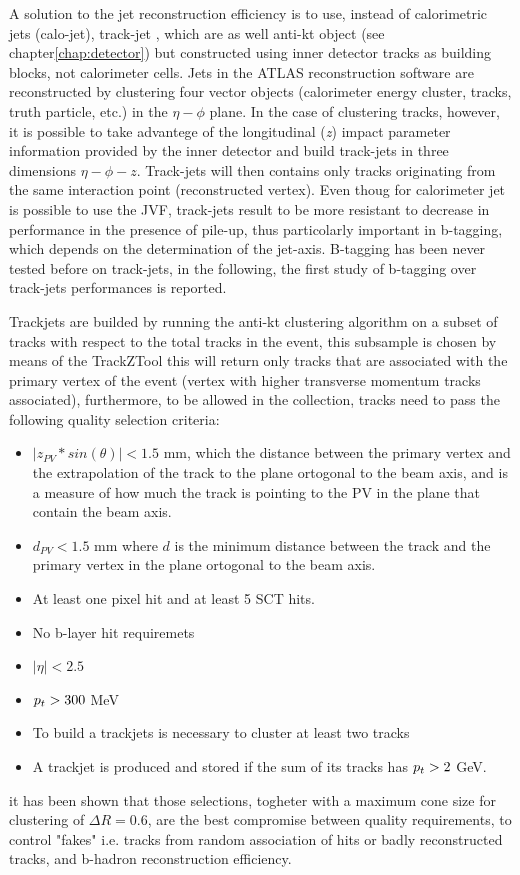 A solution to the jet reconstruction efficiency is to use, instead of calorimetric jets (calo-jet), track-jet , which are as well
anti-kt object (see chapter\ref{chap:detector}) but constructed using inner detector tracks as building blocks, not calorimeter cells.
Jets in the ATLAS reconstruction software are reconstructed by clustering four vector objects (calorimeter energy cluster, tracks, 
truth particle, etc.) in the $\eta - \phi$ plane. In the case of clustering tracks, however, it is possible to take advantege of
the longitudinal (\emph{z}) impact parameter information provided by the inner detector and build track-jets in three dimensions 
$\eta - \phi - z$. Track-jets will then contains only tracks originating from the same interaction point (reconstructed vertex).
Even thoug for calorimeter jet is possible to use the JVF, track-jets result to be more resistant to decrease in performance in the
presence of pile-up, thus particolarly important in b-tagging, which depends on the determination of the jet-axis. 
B-tagging has been never tested before on track-jets, in the following, the first study of b-tagging over track-jets 
performances is reported. 

Trackjets are builded by running the anti-kt clustering algorithm on a subset of tracks with respect to
the total tracks in the event, this subsample is chosen by means of the TrackZTool this will return only
tracks that are associated with the primary vertex of the event (vertex with higher transverse momentum 
tracks associated), furthermore, to be allowed in the collection, tracks need to pass the following 
quality selection criteria:
\begin{itemize}
\item $|z_{PV} * sin(\theta)| < 1.5$ mm, which the distance between the primary vertex and
the extrapolation of the track to the plane ortogonal to the beam axis, and is a measure of how 
much the track is pointing to the PV in the plane that contain the beam axis.
\item $d_{PV} < 1.5$ mm where $d$ is the minimum distance between the track and the primary vertex  
in the plane ortogonal to the beam axis.
\item At least one pixel hit and at least 5 SCT hits.
\item No b-layer hit requiremets
\item $|\eta| < 2.5$
\item $p_{t} > 300 $ MeV
\item To build a trackjets is necessary to cluster at least two tracks
\item A trackjet is produced and stored if the sum of its tracks has $p_{t} > 2$ GeV.
\end{itemize}
it has been shown that those selections, togheter with a maximum cone size for clustering of 
$\Delta R = 0.6$, are the best compromise between quality requirements, to control "fakes" i.e. 
tracks from random association of hits or badly reconstructed tracks, and b-hadron reconstruction efficiency.

